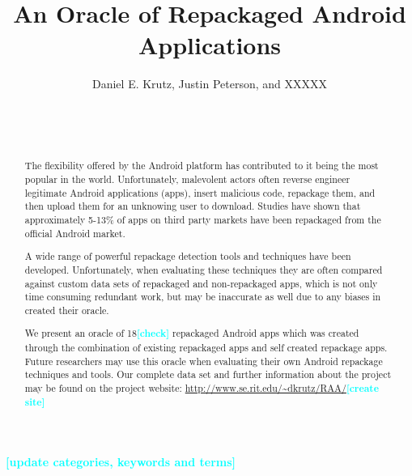 \documentclass{sig-alternate}
\newcommand{\todo}[1]{\textcolor{cyan}{\textbf{[#1]}}}
\begin{document}



\title{An Oracle of Repackaged Android Applications}

\author{
%
%
\alignauthor
Daniel E. Krutz,  Justin Peterson, and XXXXX\\ 	
       \\
        \\
        \\
}


\maketitle
\begin{abstract}

The flexibility offered by the Android platform has contributed to it being the most popular in the world. Unfortunately, malevolent actors often reverse engineer legitimate Android applications (apps), insert malicious code,  repackage them, and then upload them for an unknowing user to download. Studies have shown that approximately 5-13\% of apps on third party markets have been repackaged from the official Android market.

A wide range of powerful repackage detection tools and techniques have been developed. Unfortunately, when evaluating these techniques they are often compared against custom data sets of repackaged and non-repackaged apps, which is not only time consuming redundant work, but may be inaccurate as well due to any biases in created their oracle.

We present an oracle of 18\todo{check} repackaged Android apps which was created through the combination of existing repackaged apps and self created repackage apps. Future researchers may use this oracle when evaluating their own Android repackage techniques and tools. Our complete data set and further information about the project may be found on the project website: \url{http://www.se.rit.edu/~dkrutz/RAA/}\todo{create site}

\end{abstract}



\todo{update categories, keywords and terms}
\end{document}
